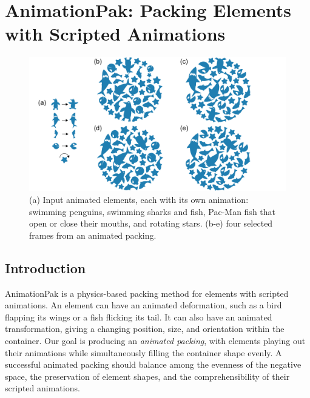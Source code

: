 \chapter{AnimationPak: Packing Elements with Scripted Animations}
\label{chapter_animationpak}

\begin{figure}[h!]
  \centering
  \includegraphics[width=1.0\textwidth]{figures/animationpak/teaser.pdf}
  \caption[An animated packing of aquatic fauna]
  {\label{fig_animationpak_teaser}
  (a) Input animated elements,
  each with its own animation: swimming penguins, swimming sharks and fish,
  Pac-Man fish that open or close their mouths, and rotating stars. 
  (b-e) four selected frames from an animated packing.  
  }
\end{figure}



\section{Introduction}
\label{animationpak_introduction}


AnimationPak is a physics-based packing method for elements with scripted animations.
An element can have an animated deformation, such as a bird flapping its
wings or a fish flicking its tail.
It can also have an animated transformation, giving a changing
position, size, and orientation within the container.
Our goal is producing an \textit{animated packing}, with elements
playing out their animations while simultaneously filling the
container shape evenly.  A successful animated packing should balance
among the evenness of the negative space, the preservation of 
element shapes, and the comprehensibility of their scripted animations.

